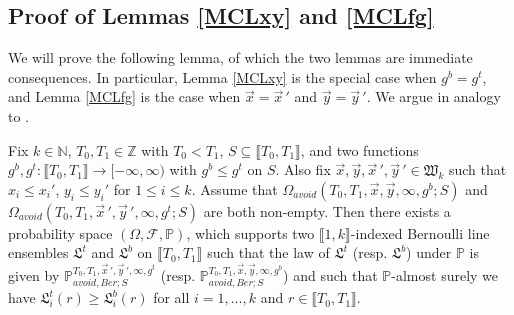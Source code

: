 \subsection{Proof of Lemmas \ref{MCLxy} and \ref{MCLfg}}

We will prove the following lemma, of which the two lemmas are immediate consequences. In particular, Lemma \ref{MCLxy} is the special case when $g^b = g^t$, and Lemma \ref{MCLfg} is the case when $\vec{x} = \vec{x}\,'$ and $\vec{y} = \vec{y}\,'$. We argue in analogy to \cite[Lemma 5.6]{DimMat}.

\begin{lemma}
	Fix $k \in \mathbb{N}$, $T_0, T_1 \in \mathbb{Z}$ with $T_0 < T_1$, $S\subseteq\llbracket T_0, T_1\rrbracket$, and two functions $g^b, g^t: \llbracket T_0, T_1 \rrbracket  \rightarrow [-\infty, \infty)$ with $g^b\leq g^t$ on $S$. Also fix $\vec{x}, \vec{y}, \vec{x}\,', \vec{y}\,' \in \mathfrak{W}_k$ such that $x_i\leq x_i'$, $y_i\leq y_i'$ for $1\leq i\leq k$. Assume that $\Omega_{avoid}(T_0, T_1, \vec{x}, \vec{y}, \infty,g^b; S)$ and $\Omega_{avoid}(T_0, T_1, \vec{x}\,', \vec{y}\,', \infty,g^t; S)$ are both non-empty. Then there exists a probability space $(\Omega, \mathcal{F}, \mathbb{P})$, which supports two $\llbracket 1, k \rrbracket$-indexed Bernoulli line ensembles $\mathfrak{L}^t$ and $\mathfrak{L}^b$ on $\llbracket T_0, T_1 \rrbracket$ such that the law of $\mathfrak{L}^{t}$ {\big (}resp. $\mathfrak{L}^b${\big )} under $\mathbb{P}$ is given by $\mathbb{P}_{avoid, Ber; S}^{T_0, T_1, \vec{x}\,', \vec{y}\,', \infty, g^t}$ {\big (}resp. $\mathbb{P}_{avoid, Ber; S}^{T_0, T_1, \vec{x}, \vec{y}, \infty, g^b}${\big )} and such that $\mathbb{P}$-almost surely we have $\mathfrak{L}_i^t(r) \geq \mathfrak{L}^b_i(r)$ for all $i = 1,\dots, k$ and $r \in \llbracket T_0, T_1 \rrbracket$.
\end{lemma}

